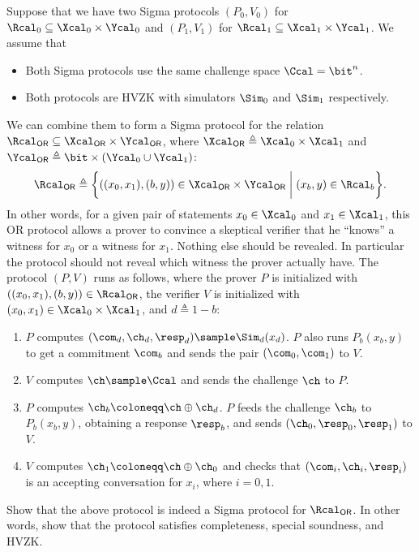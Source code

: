\begin{problem}\label{p5}
    \leavevmode\par
    Suppose that we have two Sigma protocols $(P_0, V_0)$ for $\Rcal_0\subseteq \Xcal_0\times \Ycal_0$ and $(P_1, V_1)$ for $\Rcal_1\subseteq \Xcal_1\times \Ycal_1$. We assume that
    \begin{itemize}
        \item Both Sigma protocols use the same challenge space $\Ccal=\bit^{n}$.
        \item Both protocols are HVZK with simulators $\Sim_0$ and $\Sim_1$ respectively.
    \end{itemize}
    We can combine them to form a Sigma protocol for the relation $\Rcal_\textsf{OR}\subseteq \Xcal_\textsf{OR}\times \Ycal_\textsf{OR}$, where $\Xcal_\textsf{OR} \triangleq \Xcal_0\times \Xcal_1$ and $\Ycal_\textsf{OR} \triangleq \bit \times (\Ycal_0\cup \Ycal_1)$:
    \[
        \Rcal_\textsf{OR} \triangleq \biggl\{ \left((x_0, x_1), (b,y)\right)\in \Xcal_\textsf{OR}\times \Ycal_\textsf{OR} \biggm\vert (x_b, y)\in \Rcal_b \biggr\}.
    \]
    In other words, for a given pair of statements $x_0\in\Xcal_0$ and $x_1\in \Xcal_1$, this OR protocol allows a prover to convince a skeptical verifier that he ``knows'' a witness for $x_0$ or a witness for $x_1$. Nothing else should be revealed. In particular the protocol should not reveal which witness the prover actually have. The protocol $(P, V)$ runs as follows, where the prover $P$ is initialized with $\left((x_0, x_1), (b,y)\right)\in\Rcal_\textsf{OR}$, the verifier $V$ is initialized with $(x_0, x_1)\in\Xcal_0\times \Xcal_1$, and $d\triangleq 1-b$:
    \begin{enumerate}[label=(\alph*)]
        \item $P$ computes $(\com_d, \ch_d, \resp_d) \sample \Sim_d(x_d)$. $P$ also runs $P_b(x_b, y)$ to get a commitment $\com_b$ and sends the pair $(\com_0, \com_1)$ to $V$.
        \item $V$ computes $\ch\sample\Ccal$ and sends the challenge $\ch$ to $P$.
        \item $P$ computes $\ch_b \coloneqq \ch \oplus \ch_d$. $P$ feeds the challenge $\ch_b$ to $P_b( x_b, y)$, obtaining a response $\resp_b$, and sends $(\ch_0, \resp_0, \resp_1)$ to $V$.
        \item $V$ computes $\ch_1 \coloneqq \ch \oplus \ch_0$ and checks that $(\com_i, \ch_i, \resp_i)$ is an accepting conversation for $x_i$, where $i = 0, 1$.
    \end{enumerate}
    Show that the above protocol is indeed a Sigma protocol for $\Rcal_\textsf{OR}$. In other words, show that the protocol satisfies completeness, special soundness, and HVZK.
\end{problem}



